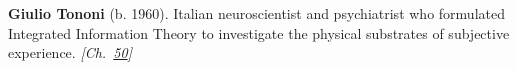 \textbf{Giulio Tononi} (b. 1960). Italian neuroscientist and psychiatrist who formulated Integrated Information Theory to investigate the physical substrates of subjective experience. \emph{[Ch.~\hyperref[ch:consciousness]{50}]}

